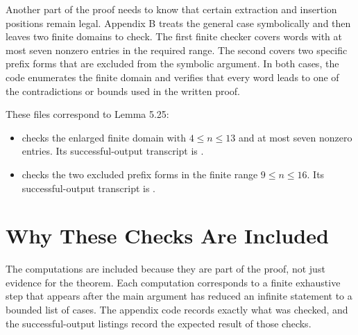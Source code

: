 \documentclass{article}
\begin{document}
Another part of the proof needs to know that certain extraction and insertion
positions remain legal. Appendix B treats the general case symbolically and
then leaves two finite domains to check. The first finite checker covers words
with at most seven nonzero entries in the required range. The second covers two
specific prefix forms that are excluded from the symbolic argument. In both
cases, the code enumerates the finite domain and verifies that every word leads
to one of the contradictions or bounds used in the written proof.

These files correspond to Lemma 5.25:
\begin{itemize}
\item {}
checks the enlarged finite domain with \(4\le n\le 13\) and at most seven
nonzero entries. Its successful-output transcript is
.
\item {} checks the
two excluded prefix forms in the finite range \(9\le n\le 16\). Its
successful-output transcript is
.
\end{itemize}

\section{Why These Checks Are Included}

The computations are included because they are part of the proof, not just
evidence for the theorem. Each computation corresponds to a finite exhaustive
step that appears after the main argument has reduced an infinite statement to
a bounded list of cases. The appendix code records exactly what was checked,
and the successful-output listings record the expected result of those checks.
\end{document}
